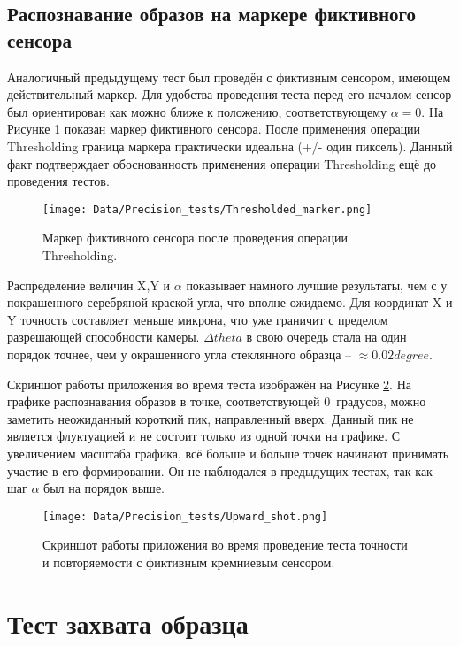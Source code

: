 \subsection{Распознавание образов на маркере фиктивного сенсора}

Аналогичный предыдущему тест был проведён с фиктивным сенсором, имеющем действительный маркер. Для удобства проведения теста перед его началом сенсор был ориентирован как можно ближе к положению, соответствующему $\alpha=0$. На Рисунке \ref{fig:thresholded_marker} показан маркер фиктивного сенсора. После применения операции Thresholding граница маркера практически идеальна (+/- один пиксель). Данный факт подтверждает обоснованность применения операции Thresholding ещё до проведения тестов.

\begin{figure}[ht]\centering
\texttt{[image: Data/Precision\_tests/Thresholded\_marker.png]}
\caption{Маркер фиктивного сенсора после проведения операции Thresholding.}
\label{fig:thresholded_marker}
\end{figure}

Распределение величин X,Y и $\alpha$ показывает намного лучшие результаты, чем с у покрашенного серебряной краской угла, что вполне ожидаемо. Для координат X и Y точность составляет меньше микрона, что уже граничит с пределом разрешающей способности камеры. $\Delta theta$  в свою очередь стала на один порядок точнее, чем у окрашенного угла стеклянного образца -- $\approx 0.02  degree$.

Скриншот работы приложения во время теста изображён на Рисунке \ref{fig:zero_peak}. На графике распознавания образов в точке, соответствующей 0~градусов, можно заметить неожиданный короткий пик, направленный вверх. Данный пик не является флуктуацией и не состоит только из одной точки на графике. С увеличением масштаба графика, всё больше и больше точек начинают принимать участие в его формировании. Он не наблюдался в предыдущих тестах, так как шаг $\alpha$ был на порядок выше.

\begin{figure}[ht]\centering
\texttt{[image: Data/Precision\_tests/Upward\_shot.png]}
\caption{Скриншот работы приложения во время проведение теста точности и повторяемости с фиктивным кремниевым сенсором.}
\label{fig:zero_peak}
\end{figure}

\section{Тест захвата образца}

